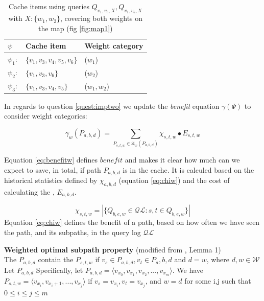 \begin{table}
\begin{tabular}{l|l|l}\hline
$\psi$		& Cache item 			& Weight category \\\hline  \hline
$\psi_1:$	& $\{v_1,v_3,v_4,v_5,v_6\}$ 	& ($w_1$)\\\hline
$\psi_2:$	& $\{v_1,v_3,v_6\}$ 		& ($w_2$)\\\hline
$\psi_3:$	& $\{v_1,v_3,v_4,v_5\}$ 	& ($w_1,w_2$)\\\hline
\end{tabular}
\caption{Cache items using queries $Q_{v_1,v_6,X}, Q_{v_1,v_5,X}$ with $X:\{w_1,w_2\}$, covering both weights on the map (fig \ref{fig:map1})}
\label{tab:expsi}
\end{table}


In regards to question \ref{quest:imptwo} we update the \textit{benefit} equation $\gamma(\Psi)$ to consider weight categories:

\begin{equation} \label{eq:benefitw}
\gamma_w(P_{a,b,d}) = \sum\limits_{P_{s,t,w} \in \mathfrak{U}_w(P_{a,b,d})} \chi_{s,t,w} \bullet E_{s,t,w}
\end{equation}

Equation \ref{eq:benefitw} defines $benefit$ and makes it clear how much can we expect to save, in total, if path $P_{a,b,d}$ is in the cache. It is calculed based on the historical statistics defined by $\chi_{a,b,d}$ (equation \ref{eq:chiw}) and the cost of calculating the \spathns, $E_{a,b,d}$.


\begin{equation} \label{eq:chiw}
\chi_{s,t,w} =  |\{ Q_{b,e,w} \in \mathcal{QL}: s, t \in Q_{b,e,w} \}|
\end{equation}
Equation \ref{eq:chiw} defines the benefit of a path, based on how often we have seen the path, and its subpaths, in the query log $\mathcal{QL}$


\begin{lemma} \label{lem:weightedoptimalproperty}
\textbf{Weighted optimal subpath property} (modified from \cite{thomsen2012}, Lemma 1)\\

The \spath $P_{a,b,d}$ contain the \spath $P_{s,t,w}$ if $v_s \in P_{a,b,d}, v_t \in {P_a,b,d}$ and $d = w$, where $d,w \in \mathcal{W}$
Let $P_{a,b,d}$
Specifically, let $P_{a,b,d} = \langle v_{x_0},v_{x_1},v_{x_2},...,v_{x_m}\rangle$. 
We have $P_{s,t,w} = \langle v_{x_i},v_{x_i+1},...,v_{x_j}\rangle$ if $v_s = v_{x_i}, v_t = v_{x_j}$, and $w = d$ for some i,j such that $0 \leq i \leq j \leq m$
\end{lemma}




